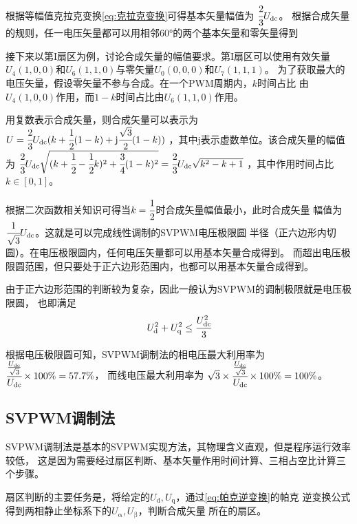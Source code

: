 根据等幅值克拉克变换\eqref{eq:克拉克变换}可得基本矢量幅值为
\(\cfrac{2}{3}U_{\mathrm{dc}}\)。
根据合成矢量的规则，任一电压矢量都可以用相邻60°的两个基本矢量和零矢量得到

接下来以第I扇区为例，讨论合成矢量的幅值要求。第I扇区可以使用有效矢量
\(U_4(1,0,0)\)和\(U_6(1,1,0)\)与零矢量\(U_0(0,0,0)\)和\(U_7(1,1,1)\)。
为了获取最大的电压矢量，假设零矢量不参与合成。在一个PWM周期内，\(k\)时间占比
由\(U_4(1,0,0)\)作用，而\(1-k\)时间占比由\(U_6(1,1,0)\)作用。

用复数表示合成矢量，则合成矢量可以表示为
\(U=\cfrac{2}{3}U_{\mathrm{dc}}(k+\cfrac 12(1-k)+\mathrm{j}\cfrac{\sqrt{3}}{2}(1-k))\)
，其中j表示虚数单位。该合成矢量的幅值为
\(\cfrac{2}{3}U_{\mathrm{dc}}\sqrt{(k+\cfrac 12-\cfrac 12k)^2+\cfrac 34(1-k)^2}
=\cfrac 23U_{\mathrm{dc}}\sqrt{k^2-k+1}\)
，其中作用时间占比\(k\in [0,1]\)。

根据二次函数相关知识可得当\(k=\cfrac 12\)时合成矢量幅值最小，此时合成矢量
幅值为\(\cfrac{1}{\sqrt 3}U_{\mathrm{dc}}\)。这就是可以完成线性调制的SVPWM电压极限圆
半径（正六边形内切圆）。在电压极限圆内，任何电压矢量都可以用基本矢量合成得到。
而超出电压极限圆范围，但只要处于正六边形范围内，也都可以用基本矢量合成得到。

由于正六边形范围的判断较为复杂，因此一般认为SVPWM的调制极限就是电压极限圆，
也即满足
\begin{equation}
    U_{\mathrm{d}}^2+U_{\mathrm{q}}^2\le \cfrac{U_{\mathrm{dc}}^2}{3}
    \label{eq:SVPWM电压极限圆}
\end{equation}

根据电压极限圆可知，SVPWM调制法的相电压最大利用率为
\(\cfrac{\frac{U_{\mathrm{dc}}}{\sqrt 3}}{U_{\mathrm{dc}}}\times100\%=57.7\%\)，
而线电压最大利用率为
\(\sqrt{3}\times \cfrac{\frac{U_{\mathrm{dc}}}{\sqrt 3}}{U_{\mathrm{dc}}}
\times100\%= 100\%\)。

\subsection{SVPWM调制法}
\label{sec:SVPWM调制法}

SVPWM调制法是基本的SVPWM实现方法，其物理含义直观，但是程序运行效率较低，
这是因为需要经过扇区判断、基本矢量作用时间计算、三相占空比计算三个步骤。

扇区判断的主要任务是，将给定的\(U_{\mathrm{d}},U_{\mathrm{q}}\)，通过\eqref{eq:帕克逆变换}的帕克
逆变换公式得到两相静止坐标系下的\(U_{\mathrm{\alpha}},U_{\mathrm{\beta}}\)，判断合成矢量
所在的扇区。

